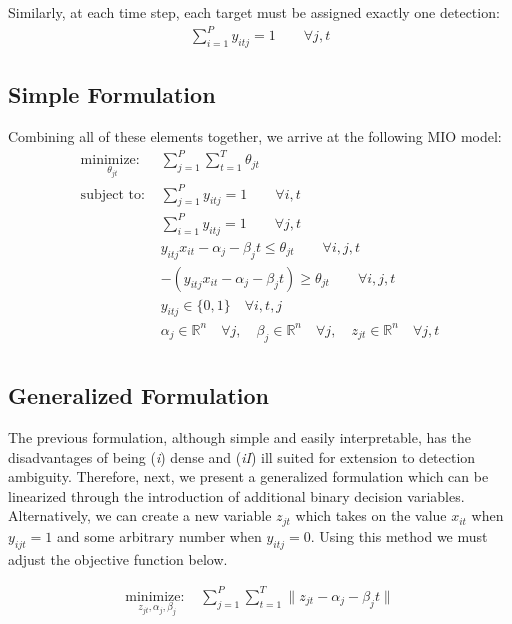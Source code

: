 \documentclass[journal]{IEEEtran}
\begin{document}
Similarly, at each time step, each target must be assigned exactly one detection:
\begin{align}
\sum_{i=1}^{P} y_{itj} = 1 \qquad \forall j,t
\end{align}

\subsection{Simple Formulation}
Combining all of these elements together, we arrive at the following MIO model:
\begin{align*}
\underset{\theta_{jt}}{\text{minimize: }} & \sum_{j=1}^{P} \sum_{t=1}^{T} \theta_{jt} \\
\text{subject to: }	& \sum_{j=1}^{P} y_{itj} = 1 \qquad \forall i,t\\
				& \sum_{i=1}^{P} y_{itj} = 1 \qquad \forall j,t\\
				& y_{itj}x_{it} - \alpha_{j} - \beta_{j}t \leq \theta_{jt} \qquad \forall i,j,t\\
				& -(y_{itj}x_{it} - \alpha_{j} - \beta_{j}t) \geq \theta_{jt} \qquad \forall i,j,t\\
			 	& y_{itj} \in \{0,1\} \quad \forall i,t,j\\
				& \alpha_{j} \in \mathbb{R}^n \quad \forall j,\quad \beta_{j} \in \mathbb{R}^n \quad \forall j, \quad z_{jt} \in \mathbb{R}^n \quad \forall j,t\\
\end{align*}

\subsection{Generalized Formulation}
The previous formulation, although simple and easily interpretable, has the disadvantages of being (\textit{i}) dense and (\textit{iI}) ill suited for extension to detection ambiguity. Therefore, next, we present a generalized formulation which can be linearized through the introduction of additional binary decision variables. Alternatively, we can create a new variable $z_{jt}$ which takes on the value $x_{it}$ when $y_{ijt}=1$ and some arbitrary number when $y_{itj}=0$. Using this method we must adjust the objective function below. 

\begin{align}\label{eq:generalized_objective}
\underset{z_{jt}, \alpha_{j}, \beta_{j}}{\text{minimize: }} & \sum_{j=1}^{P} \sum_{t=1}^{T} \|z_{jt} - \alpha_{j} - \beta_{j}t\|
\end{align}
\end{document}
